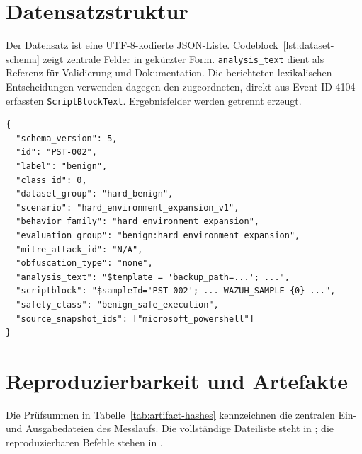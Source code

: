 \documentclass[12pt,a4paper,oneside,parskip=half]{scrreprt}
\begin{document}
\appendix

\chapter{Datensatzstruktur}
\label{app:dataset}
Der Datensatz ist eine UTF-8-kodierte JSON-Liste. Codeblock~\ref{lst:dataset-schema} zeigt zentrale Felder in gekürzter Form. \texttt{analysis\_text} dient als Referenz für Validierung und Dokumentation. Die berichteten lexikalischen Entscheidungen verwenden dagegen den zugeordneten, direkt aus Event-ID 4104 erfassten \texttt{ScriptBlockText}. Ergebnisfelder werden getrennt erzeugt.

\begin{samepage}
\begin{lstlisting}[language={},caption={Vereinfachte Datensatzstruktur},label={lst:dataset-schema}]
{
  "schema_version": 5,
  "id": "PST-002",
  "label": "benign",
  "class_id": 0,
  "dataset_group": "hard_benign",
  "scenario": "hard_environment_expansion_v1",
  "behavior_family": "hard_environment_expansion",
  "evaluation_group": "benign:hard_environment_expansion",
  "mitre_attack_id": "N/A",
  "obfuscation_type": "none",
  "analysis_text": "$template = 'backup_path=...'; ...",
  "scriptblock": "$sampleId='PST-002'; ... WAZUH_SAMPLE {0} ...",
  "safety_class": "benign_safe_execution",
  "source_snapshot_ids": ["microsoft_powershell"]
}
\end{lstlisting}
\end{samepage}
\chapter{Reproduzierbarkeit und Artefakte}
\label{app:reproducibility}
Die Prüfsummen in Tabelle~\ref{tab:artifact-hashes} kennzeichnen die zentralen Ein- und Ausgabedateien des Messlaufs. Die vollständige Dateiliste steht in ; die reproduzierbaren Befehle stehen in .
\end{document}
